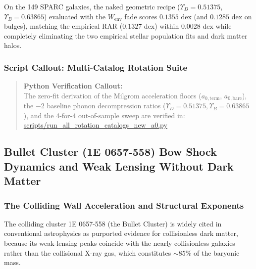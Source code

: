 \documentclass[11pt,a4paper]{article}
\begin{document}
On the 149 SPARC galaxies, the naked geometric recipe ($\Upsilon_D = 0.51375$, $\Upsilon_B = 0.63865$) evaluated with the $W_{\text{env}}$ fade scores \textbf{$0.1355\text{ dex}$} (and $0.1285\text{ dex}$ on bulges), matching the empirical RAR ($0.1327\text{ dex}$) within $0.0028\text{ dex}$ while completely eliminating the two empirical stellar population fits and dark matter halos.

\subsubsection{Script Callout: Multi-Catalog Rotation Suite}
\label{subsubsec:callout_rotation}

\begin{quote}
\textbf{Python Verification Callout:}\\
The zero-fit derivation of the Milgrom acceleration floors ($a_{0,\text{term}}$, $a_{0,\text{bare}}$), the $-2$ baseline phonon decompression ratios ($\Upsilon_D = 0.51375, \Upsilon_B = 0.63865$), and the 4-for-4 out-of-sample sweep are verified in:\\
\url{scripts/run_all_rotation_catalogs_new_a0.py}
\end{quote}

\subsection{Bullet Cluster (1E 0657-558) Bow Shock Dynamics and Weak Lensing Without Dark Matter}
\label{subsec:bullet_cluster}

\subsubsection{The Colliding Wall Acceleration and Structural Exponents}
\label{subsubsec:bullet_constants}

The colliding cluster 1E 0657-558 (the Bullet Cluster) is widely cited in conventional astrophysics as purported evidence for collisionless dark matter, because its weak-lensing peaks coincide with the nearly collisionless galaxies rather than the collisional X-ray gas, which constitutes $\sim 85\%$ of the baryonic mass.
\end{document}
